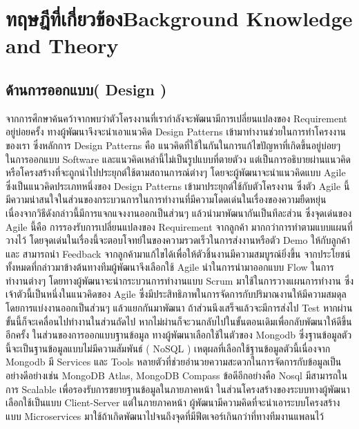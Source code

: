 \chapter{\ifcpe ทฤษฎีที่เกี่ยวข้อง\else Background Knowledge and Theory\fi}


\section{ด้านการออกแบบ( Design )}
จากการศึกษาค้นคว้าจากพบว่าตัวโครงงานที่เรากำลังจะพัฒนามีการเปลี่ยนแปลงของ Requirement อยู่บ่อยครั้ง  ทางผู้พัฒนาจึงจะนำเอาแนวคิด Design Patterns \cite{designPatterns} เข้ามาทำงานช่วยในการทำโครงงานของเรา 
ซึ่งหลักการ Design Patterns คือ แนวคิดที่ใช้ในกันในการแก้ไขปัญหาที่เกิดขึ้นอยู่บ่อยๆ ในการออกแบบ Software และแนวคิดเหล่านี้ไม่เป็นรูปแบบที่ตายตัวง แต่เป็นการอธิบายผ่านแนวคิดหรือโครงสร้างที่จะถูกนำไปประยุกต์ใช้ตามสถานการณ์ต่างๆ  
โดยจะผู้พัฒนาจะนำแนวคิดแบบ Agile \cite{agile}  ซึ่งเป็นแนวคิดประเภทหนึ่งของ Design Patterns เข้ามาประยุกต์ใช้กับตัวโครงงาน   ซึ่งตัว Agile นี้มีความน่าสนใจในส่วนของกระบวนการในการทำงานที่มีความโดดเด่นในเรื่องของความยืดหยุ่น  เนื่องจากวิธีดังกล่าวนี้มีการแจกแจงงานออกเป็นส่วนๆ  แล้วนำมาพัฒนากันเป็นทีละส่วน  
ซึ่งจุดเด่นของ Agile นี้คือ การรองรับการเปลี่ยนแปลงของ Requirement จากลูกค้า มากกว่าการทำตามแบบแผนที่วางไว้  
โดยจุดเด่นในเรื่องนี้จะตอบโจทย์ในของความรวดเร็วในการส่งงานหรือตัว Demo ให้กับลูกค้าและ สามารถนำ Feedback จากลูกค้ามาแก้ไขได้เพื่อให้ตัวชิ้นงานมีความสมบูรณ์ยิ่งขึ้น 
 จากประโยชน์ทั้งหมดที่กล่าวมาข้างต้นทางทีมผู้พัฒนาจึงเลือกใช้ Agile นำในการนำมาออกแบบ Flow ในการทำงานต่างๆ  โดยทางผู้พัฒนาจะนำกระบวนการทำงานแบบ Scrum \cite{srcum} มาใช้ในการวางแผนการทำงาน 
ซึ่งเจ้าตัวนี้เป็นหนึ่งในแนวคิดของ Agile ซึ่งมีประสิทธิภาพในการจัดการกับปริมาณงานให้มีความสมดุลโดยการแบ่งงานออกเป็นส่วนๆ แล้วแยกกันมาพัฒนา  ถ้าส่วนนึงเสร็จแล้วจะมีการส่งไป Test  หากผ่านขั้นนี้ก็จะเคลื่อนไปทำงานในส่วนถัดไป  หากไม่ผ่านก็จะวนกลับไปในขั้นตอนเดิมเพื่อกลับพัฒนาให้ดีขึ้นอีกครั้ง  
ในส่วนของการออกแบบฐานข้อมูล ทางผู้พัฒนาเลือกใช้ในตัวของ Mongodb \cite{MongoDB} ซึ่งฐานข้อมูลตัวนี้จะเป็นฐานข้อมูลแบบไม่มีความสัมพันธ์ ( NoSQL ) 
เหตุผลที่เลือกใช้ฐานข้อมูลตัวนี้เนื่องจาก Mongodb มี Services และ Tools หลายตัวที่ช่วยอำนวยความสะดวกในการจัดการกับข้อมูลเป็นอย่างดีอย่างเช่น MongoDB Atlas, MongoDB Compass 
ข้อดีอีกอย่างคือ Nosql มีสามารถในการ Scalable เพื่อรองรับการขยายฐานข้อมูลในภายภาคหน้า  ในส่วนโครงสร้างของระบบทางผู้พัฒนาเลือกใช้เป็นแบบ Client-Server \cite{Client-Server} แต่ในภายภาคหน้า  ผู้พัฒนามีความคิดที่จะนำเอาระบบโครงสร้างแบบ Microservices \cite{Microservice}มาใช้ถ้าเกิดพัฒนาไปจนถึงจุดที่มีฟีตเจอร์เกินกว่าที่ทางทีมงานแพลนไว้  
